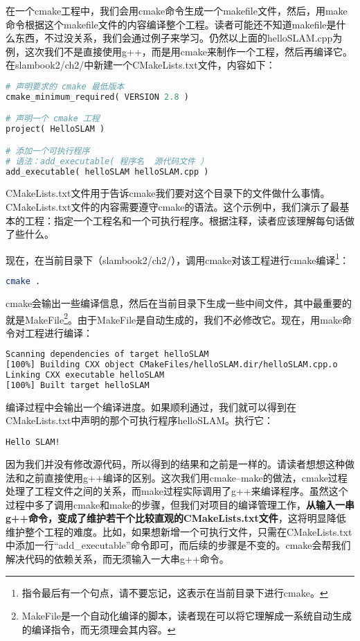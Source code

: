 在一个cmake工程中，我们会用cmake命令生成一个makefile文件，然后，用make命令根据这个makefile文件的内容编译整个工程。读者可能还不知道makefile是什么东西，不过没关系，我们会通过例子来学习。仍然以上面的helloSLAM.cpp为例，这次我们不是直接使用g++，而是用cmake来制作一个工程，然后再编译它。在slambook2/ch2/中新建一个CMakeLists.txt文件，内容如下：

\begin{lstlisting}[language=Python,caption=slambook2/ch2/CMakeLists.txt]
# 声明要求的 cmake 最低版本
cmake_minimum_required( VERSION 2.8 )

# 声明一个 cmake 工程
project( HelloSLAM )

# 添加一个可执行程序
# 语法：add_executable( 程序名  源代码文件 ）
add_executable( helloSLAM helloSLAM.cpp )
\end{lstlisting}

CMakeLists.txt文件用于告诉cmake我们要对这个目录下的文件做什么事情。CMakeLists.txt文件的内容需要遵守cmake的语法。这个示例中，我们演示了最基本的工程：指定一个工程名和一个可执行程序。根据注释，读者应该理解每句话做了些什么。

现在，在当前目录下（slambook2/ch2/），调用cmake对该工程进行cmake编译\footnote{指令最后有一个句点，请不要忘记，这表示在当前目录下进行cmake。}：

\begin{lstlisting}[language=sh,caption=终端输入：]
cmake .
\end{lstlisting}

cmake会输出一些编译信息，然后在当前目录下生成一些中间文件，其中最重要的就是MakeFile\footnote{MakeFile是一个自动化编译的脚本，读者现在可以将它理解成一系统自动生成的编译指令，而无须理会其内容。}。由于MakeFile是自动生成的，我们不必修改它。现在，用make命令对工程进行编译：
\begin{lstlisting}[language=sh,caption=终端输入：]
% make
Scanning dependencies of target helloSLAM
[100%] Building CXX object CMakeFiles/helloSLAM.dir/helloSLAM.cpp.o
Linking CXX executable helloSLAM
[100%] Built target helloSLAM
\end{lstlisting}

编译过程中会输出一个编译进度。如果顺利通过，我们就可以得到在CMakeLists.txt中声明的那个可执行程序helloSLAM。执行它：
\begin{lstlisting}[language=sh,caption=终端输入：]
% ./helloSLAM
Hello SLAM!
\end{lstlisting}

因为我们并没有修改源代码，所以得到的结果和之前是一样的。请读者想想这种做法和之前直接使用g++编译的区别。这次我们用cmake--make的做法，cmake过程处理了工程文件之间的关系，而make过程实际调用了g++来编译程序。虽然这个过程中多了调用cmake和make的步骤，但我们对项目的编译管理工作，\textbf{从输入一串g++命令，变成了维护若干个比较直观的CMakeLists.txt文件}，这将明显降低维护整个工程的难度。比如，如果想新增一个可执行文件，只需在CMakeLists.txt中添加一行“add\_executable”命令即可，而后续的步骤是不变的。cmake会帮我们解决代码的依赖关系，而无须输入一大串g++命令。


